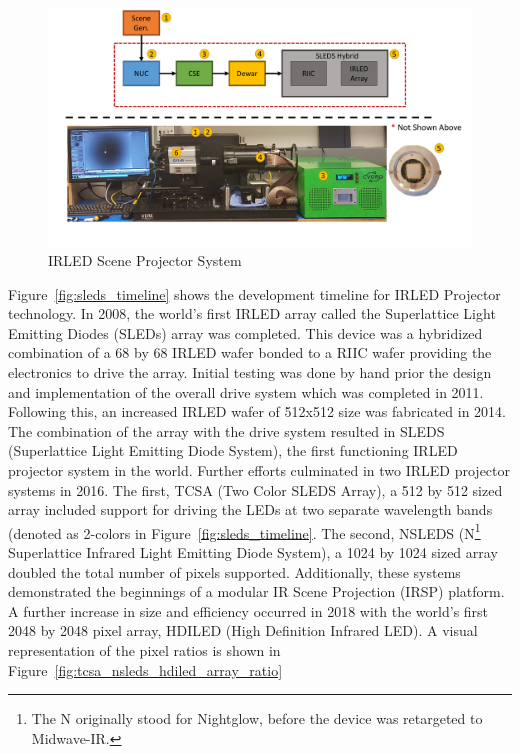 \begin{figure}
    \centering
    \includegraphics[trim=0.45in 1.25in 0.0in 0in,width=1.0\textwidth]{fig/sleds_system.pdf}
    \caption{IRLED Scene Projector System}
    \label{fig:sleds_system}
\end{figure}

Figure~\ref{fig:sleds_timeline} shows the development timeline for IRLED Projector technology. In 2008, the world's first IRLED array called the Superlattice Light Emitting Diodes (SLEDs) array was completed\cite{ahmed1}. This device was a hybridized combination of a 68 by 68 IRLED wafer bonded to a RIIC wafer\cite{das2} providing the electronics to drive the array. Initial testing was done by hand prior the design and implementation of the overall drive system which was completed in 2011. Following this, an increased IRLED wafer of 512x512 size was fabricated in 2014\cite{norton1}. The combination of the array with the drive system resulted in SLEDS (Superlattice Light Emitting Diode System), the first functioning IRLED projector system in the world. Further efforts culminated in two IRLED projector systems in 2016. The first, TCSA (Two Color SLEDS Array), a 512 by 512 sized array\cite{McGeeEtAl2015, ejzak1, ejzak2, EjzakEtAl2016, RickerEtAl2017} included support for driving the LEDs at two separate wavelength bands (denoted as 2-colors in Figure~\ref{fig:sleds_timeline}. The second, NSLEDS (N\footnote{The N originally stood for Nightglow, before the device was retargeted to Midwave-IR.} Superlattice Infrared Light Emitting Diode System), a 1024 by 1024 sized array\cite{benedict1} doubled the total number of pixels supported. Additionally, these systems demonstrated the beginnings of a modular IR Scene Projection (IRSP) platform\cite{BrowningEtAl2019}. A further increase in size and efficiency occurred in 2018 with the world's first 2048 by 2048 pixel array, HDILED (High Definition Infrared LED). A visual representation of the pixel ratios is shown in Figure~\ref{fig:tcsa_nsleds_hdiled_array_ratio}

